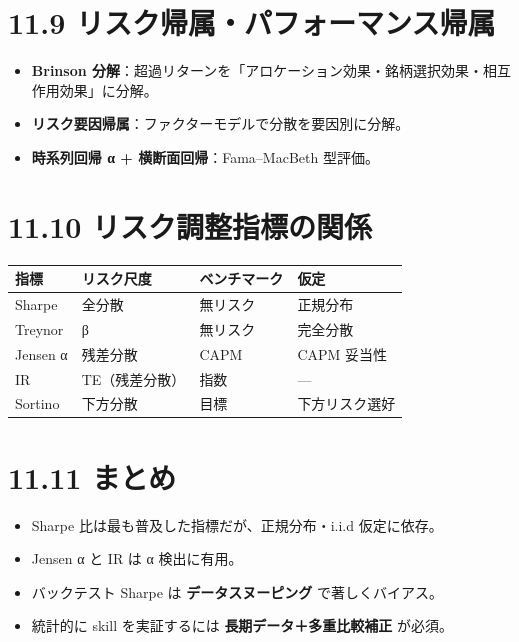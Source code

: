 \documentclass[11pt,a4paper]{report}
\begin{document}
\section{11.9 リスク帰属・パフォーマンス帰属}

\begin{itemize}
\item \textbf{Brinson 分解}：超過リターンを「アロケーション効果・銘柄選択効果・相互作用効果」に分解。
\item \textbf{リスク要因帰属}：ファクターモデルで分散を要因別に分解。
\item \textbf{時系列回帰 α + 横断面回帰}：Fama–MacBeth 型評価。
\end{itemize}

\section{11.10 リスク調整指標の関係}

\begin{center}
\begin{tabular}{|l|l|l|l|}
\hline
指標 & リスク尺度 & ベンチマーク & 仮定 \\ \hline
Sharpe & 全分散 & 無リスク & 正規分布 \\ \hline
Treynor & β & 無リスク & 完全分散 \\ \hline
Jensen α & 残差分散 & CAPM & CAPM 妥当性 \\ \hline
IR & TE（残差分散） & 指数 & — \\ \hline
Sortino & 下方分散 & 目標 & 下方リスク選好 \\ \hline
\end{tabular}
\end{center}

\section{11.11 まとめ}

\begin{itemize}
\item Sharpe 比は最も普及した指標だが、正規分布・i.i.d 仮定に依存。
\item Jensen α と IR は α 検出に有用。
\item バックテスト Sharpe は \textbf{データスヌーピング} で著しくバイアス。
\item 統計的に skill を実証するには \textbf{長期データ＋多重比較補正} が必須。
\end{itemize}

\noindent\hrulefill
\end{document}
